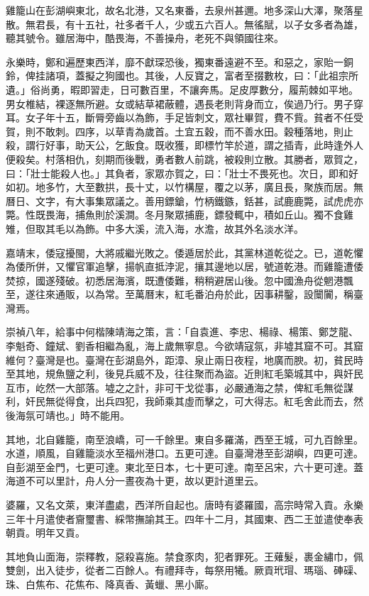\begin{pinyinscope}
雞籠山在彭湖嶼東北，故名北港，又名東番，去泉州甚邇。地多深山大澤，聚落星散。無君長，有十五社，社多者千人，少或五六百人。無徭賦，以子女多者為雄，聽其號令。雖居海中，酷畏海，不善操舟，老死不與領國往來。

永樂時，鄭和遍歷東西洋，靡不獻琛恐後，獨東番遠避不至。和惡之，家貽一銅鈴，俾挂諸項，蓋擬之狗國也。其後，人反寶之，富者至掇數枚，曰：「此祖宗所遺。」俗尚勇，暇即習走，日可數百里，不讓奔馬。足皮厚數分，履荊棘如平地。男女椎結，裸逐無所避。女或結草裙蔽體，遇長老則背身而立，俟過乃行。男子穿耳。女子年十五，斷脣旁齒以為飾，手足皆刺文，眾社畢賀，費不貲。貧者不任受賀，則不敢刺。四序，以草青為歲首。土宜五穀，而不善水田。穀種落地，則止殺，謂行好事，助天公，乞飯食。既收獲，即標竹竿於道，謂之插青，此時逢外人便殺矣。村落相仇，刻期而後戰，勇者數人前跳，被殺則立散。其勝者，眾賀之，曰：「壯士能殺人也。」其負者，家眾亦賀之，曰：「壯士不畏死也。次日，即和好如初。地多竹，大至數拱，長十丈，以竹構屋，覆之以茅，廣且長，聚族而居。無曆日、文字，有大事集眾議之。善用鏢鎗，竹柄鐵鏃，銛甚，試鹿鹿斃，試虎虎亦斃。性既畏海，捕魚則於溪澗。冬月聚眾捕鹿，鏢發輒中，積如丘山。獨不食雞雉，但取其毛以為飾。中多大溪，流入海，水澹，故其外名淡水洋。

嘉靖末，倭寇擾閩，大將戚繼光敗之。倭遁居於此，其黨林道乾從之。已，道乾懼為倭所併，又懼官軍追擊，揚帆直抵浡泥，攘其邊地以居，號道乾港。而雞籠遭倭焚掠，國遂殘破。初悉居海濱，既遭倭難，稍稍避居山後。忽中國漁舟從魍港飄至，遂往來通販，以為常。至萬曆末，紅毛番泊舟於此，因事耕鑿，設闤闠，稱臺灣焉。

崇禎八年，給事中何楷陳靖海之策，言：「自袁進、李忠、楊祿、楊策、鄭芝龍、李魁奇、鐘斌、劉香相繼為亂，海上歲無寧息。今欲靖寇氛，非墟其窟不可。其窟維何？臺灣是也。臺灣在彭湖島外，距漳、泉止兩日夜程，地廣而腴。初，貧民時至其地，規魚鹽之利，後見兵威不及，往往聚而為盜。近則紅毛築城其中，與奸民互市，屹然一大部落。墟之之計，非可干戈從事，必嚴通海之禁，俾紅毛無從謀利，奸民無從得食，出兵四犯，我師乘其虛而擊之，可大得志。紅毛舍此而去，然後海氛可靖也。」時不能用。

其地，北自雞籠，南至浪嶠，可一千餘里。東自多羅滿，西至王城，可九百餘里。水道，順風，自雞籠淡水至福州港口。五更可達。自臺灣港至彭湖嶼，四更可達。自彭湖至金門，七更可達。東北至日本，七十更可達。南至呂宋，六十更可達。蓋海道不可以里計，舟人分一晝夜為十更，故以更計道里云。

婆羅，又名文萊，東洋盡處，西洋所自起也。唐時有婆羅國，高宗時常入貢。永樂三年十月遣使者齎璽書、綵幣撫諭其王。四年十二月，其國東、西二王並遣使奉表朝貢。明年又貢。

其地負山面海，崇釋教，惡殺喜施。禁食豕肉，犯者罪死。王薙髮，裹金繡巾，佩雙劍，出入徒步，從者二百餘人。有禮拜寺，每祭用犧。厥貢玳瑁、瑪瑙、硨磲、珠、白焦布、花焦布、降真香、黃蠟、黑小廝。


\end{pinyinscope}
